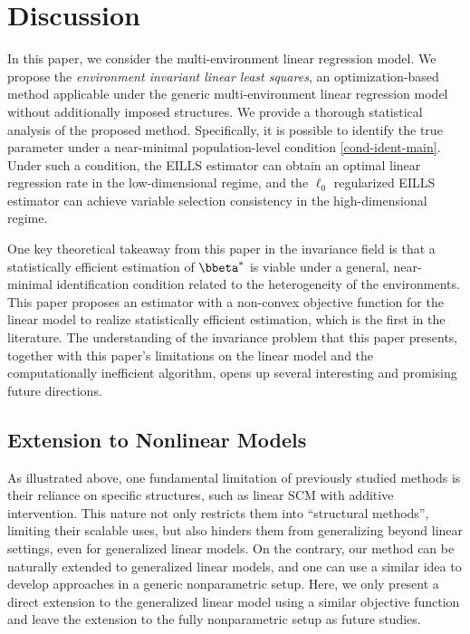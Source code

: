 \documentclass[10pt]{article}
\numberwithin{equation}{section}
\begin{document}
{\section{Discussion}

In this paper, we consider the multi-environment linear regression model. We propose the {\it environment invariant linear least squares}, an optimization-based method applicable under the generic multi-environment linear regression model without additionally imposed structures. We provide a thorough statistical analysis of the proposed method. Specifically, it is possible to identify the true parameter under a near-minimal population-level condition \cref{cond-ident-main}. Under such a condition, the EILLS estimator can obtain an optimal linear regression rate in the low-dimensional regime, and the $\ell_0$ regularized EILLS estimator can achieve variable selection consistency in the high-dimensional regime. 

One key theoretical takeaway from this paper in the invariance field is that a statistically efficient estimation of $\bbeta^*$ is viable under a general, near-minimal identification condition related to the heterogeneity of the environments. This paper proposes an estimator with a non-convex objective function for the linear model to realize statistically efficient estimation, which is the first in the literature. The understanding of the invariance problem that this paper presents, together with this paper's limitations on the linear model and the computationally inefficient algorithm, opens up several interesting and promising future directions.

\subsection{Extension to Nonlinear Models} 
\label{sec:ex-nonlinear}

As illustrated above, one fundamental limitation of previously studied methods is their reliance on specific structures, such as linear SCM with additive intervention. This nature not only restricts them into ``structural methods'', limiting their scalable uses, but also hinders them from generalizing beyond linear settings, even for generalized linear models. On the contrary, our method can be naturally extended to generalized linear models, and one can use a similar idea to develop approaches in a generic nonparametric setup. Here, we only present a direct extension to the generalized linear model using a similar objective function and leave the extension to the fully nonparametric setup as future studies.

}
\end{document}
